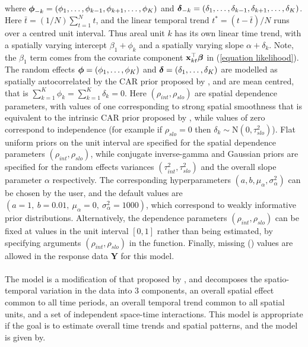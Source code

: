 \documentclass[article, nojss]{jss}
\newcommand{\bd}[1]{\ensuremath{\mbox{\boldmath $#1$}}}
\begin{document}
where $\bd{\phi}_{-k}=(\phi_{1},\ldots,\phi_{k-1}, \phi_{k+1},\ldots,\phi_{K})$ and $\bd{\delta}_{-k}=(\delta_{1},\ldots,\delta_{k-1}, \delta_{k+1},\ldots,\delta_{K})$. Here $\bar{t}=(1/N)\sum_{t=1}^N t$, and the linear temporal trend $t^{*}=(t - \bar{t})/N$ runs over a centred unit interval.  Thus areal unit $k$ has its own linear time trend, with a spatially varying intercept $\beta_{1}+\phi_{k}$ and a spatially varying slope $\alpha+\delta_{k}$. Note, the $\beta_1$ term comes from the covariate component $\mathbf{x}_{kt}^{\top}\bd{\beta}$ in (\ref{equation likelihood}). The random effects $\bd{\phi}=(\phi_1,\ldots,\phi_K)$ and  $\bd{\delta}=(\delta_1,\ldots,\delta_K)$ are modelled as spatially autocorrelated by the CAR prior proposed by \cite{leroux2000}, and are mean centred, that is $\sum_{k=1}^{K}\phi_{k}=\sum_{k=1}^{K}\delta_{k}=0$. Here $(\rho_{int}, \rho_{slo})$ are spatial dependence parameters, with values of one corresponding to strong spatial smoothness that is equivalent to the intrinsic CAR prior proposed by  \cite{besag1991}, while values of zero correspond to independence (for example if $\rho_{slo}=0$ then $\delta_k\sim\mbox{N}(0, \tau^2_{slo})$). Flat uniform priors on the unit interval are specified for the spatial dependence parameters $(\rho_{int}, \rho_{slo})$, while conjugate inverse-gamma and Gaussian priors are specified for the random effects variances $(\tau^2_{int}, \tau^2_{slo})$ and the overall slope parameter $\alpha$ respectively. The corresponding hyperparameters $(a, b, \mu_{\alpha}, \sigma^2_{\alpha})$ can be chosen by the user, and the default values are $(a=1, ~b=0.01,~ \mu_{\alpha}=0,~ \sigma^2_{\alpha}=1000)$, which correspond to weakly informative prior distributions. Alternatively, the dependence parameters $(\rho_{int}, \rho_{slo})$ can be fixed at values in the unit interval $[0,1]$ rather than being estimated, by specifying arguments $(\rho_{int}, \rho_{slo})$ in  the  function. Finally, missing () values are allowed in the response data $\mathbf{Y}$ for this model.\\

\\
The model is a  modification of that proposed by \cite{knorrheld2000},  and decomposes the spatio-temporal variation in the data into 3 components, an overall spatial effect common to all time periods, an overall temporal trend common to all spatial units, and a set of independent space-time interactions. This model is appropriate if the goal is to estimate overall time trends and spatial patterns, and the model  is given by.
\end{document}
